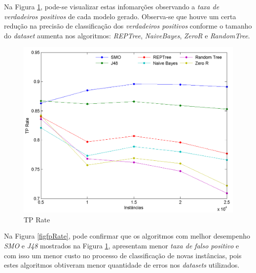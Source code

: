 \documentclass[
	12pt,				%
	openright,			%
	oneside,	
	a4paper,				%
	english,				%
	brazil				%
]{abntex2/abntex2} %
\begin{document}

Na Figura \ref{figtpRate}, pode-se visualizar estas infomarções observando a \textit{taxa de verdadeiros positivos} de cada modelo gerado. Observa-se que houve um certa redução na precisão de classificação dos \textit{verdadeiros positivos}  conforme o tamanho do \textit{dataset} aumenta  nos algoritmos: \textit{REPTree}, \textit{NaiveBayes}, \textit{ZeroR} e \textit{RandomTree}.

\begin{figure}[!htb]
	\caption{\label{figtpRate} TP Rate}
	\begin{center}
		\includegraphics[scale=0.6]{graphs/tp_graph.png}
	\end{center}
\end{figure}

Na Figura \ref{figfpRate}, pode confirmar que os algoritmos com melhor desempenho \textit{SMO} e \textit{J48} mostrados na Figura \ref{figtpRate}, apresentam menor \textit{taxa de falso positivo} e com isso um menor custo no processo de classificação de novas instâncias, pois estes algoritmos obtiveram menor quantidade de erros nos \textit{datasets} utilizados.
\\
\end{document}
